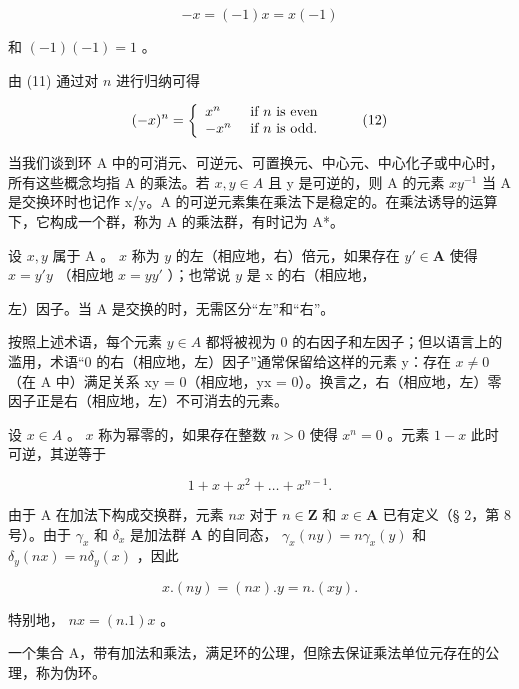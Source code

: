 \[
- x = (- 1) x = x (- 1)
\]

和 \((-1)(-1) = 1\) 。

由 (11) 通过对 \(n\) 进行归纳可得

\[
(- x) ^ {n} = \left\{ \begin{array}{l l} x ^ {n} & \text { if   } n \text {   is   even } \\ - x ^ {n} & \text { if   } n \text {   is   odd. } \end{array} \right.\tag{12}
\]

当我们谈到环 A 中的可消元、可逆元、可置换元、中心元、中心化子或中心时，所有这些概念均指 A 的乘法。若 \(x, y \in A\) 且 y 是可逆的，则 A 的元素 \(xy^{-1}\) 当 A 是交换环时也记作 x/y。A 的可逆元素集在乘法下是稳定的。在乘法诱导的运算下，它构成一个群，称为 A 的乘法群，有时记为 A*。

设 \(x, y\) 属于 A 。 \(x\) 称为 \(y\) 的左（相应地，右）倍元，如果存在 \(y' \in \mathbf{A}\) 使得 \(x = y'y\) （相应地 \(x = yy'\) ）；也常说 \(y\) 是 x 的右（相应地，

左）因子。当 A 是交换的时，无需区分“左”和“右”。

按照上述术语，每个元素 \(y \in A\) 都将被视为 0 的右因子和左因子；但以语言上的滥用，术语“0 的右（相应地，左）因子”通常保留给这样的元素 y：存在 \(x \neq 0\) （在 A 中）满足关系 xy = 0（相应地，yx = 0）。换言之，右（相应地，左）零因子正是右（相应地，左）不可消去的元素。

设 \(x \in A\) 。 \(x\) 称为幂零的，如果存在整数 \(n > 0\) 使得 \(x^n = 0\) 。元素 \(1 - x\) 此时可逆，其逆等于

\[
1 + x + x ^ {2} + \dots + x ^ {n - 1}.
\]

由于 A 在加法下构成交换群，元素 \(nx\) 对于 \(n \in \mathbf{Z}\) 和 \(x \in \mathbf{A}\) 已有定义（§ 2，第 8 号）。由于 \(\gamma_x\) 和 \(\delta_x\) 是加法群 \(\mathbf{A}\) 的自同态， \(\gamma_x(ny) = n\gamma_x(y)\) 和 \(\delta_y(nx) = n\delta_y(x)\) ，因此

\[
x. (n y) = (n x). y = n. (x y).
\]

特别地， \(nx = (n.1)x\) 。

一个集合 A，带有加法和乘法，满足环的公理，但除去保证乘法单位元存在的公理，称为伪环。

